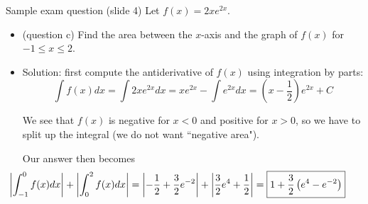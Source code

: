 \begin{frame}{Sample exam question (slide 4)}
    Let $f(x)=2xe^{2x}$.
    \begin{itemize}
        \item (question c) Find the area between the $x$-axis and the graph of $f(x)$ for $-1\leq x\leq 2$.
        \pause\item Solution: first compute the antiderivative of $f(x)$ using integration by parts: \[\int f(x)dx=\int2xe^{2x}dx=xe^{2x}-\int e^{2x}dx=\left(x-\frac{1}{2}\right)e^{2x}+C\]\pause
        
        We see that $f(x)$ is negative for $x<0$ and positive for $x>0$, so we have to split up the integral (we do not want ``negative area").\pause

        Our answer then becomes \[\hspace{-11mm}\left|\int_{-1}^0 f(x)dx\right|+\left|\int_{0}^{2} f(x)dx\right|=\left|-\frac{1}{2}+\frac{3}{2}e^{-2}\right|+\left|\frac{3}{2}e^4+\frac{1}{2}\right|=\boxed{1+\frac{3}{2}\left(e^4-e^{-2}\right)}\]
    \end{itemize}
    
\end{frame}
